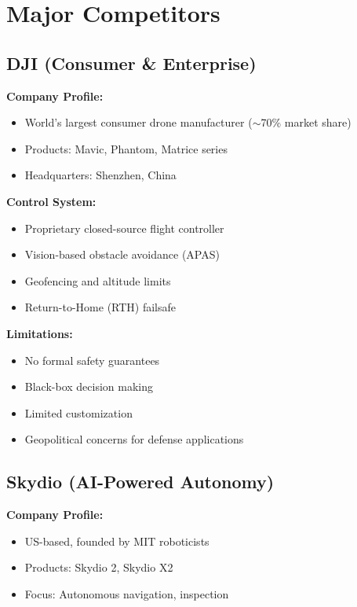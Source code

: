 \section{Major Competitors}

\subsection{DJI (Consumer \& Enterprise)}

\textbf{Company Profile:}
\begin{itemize}
    \item World's largest consumer drone manufacturer ($\sim$70\% market share)
    \item Products: Mavic, Phantom, Matrice series
    \item Headquarters: Shenzhen, China
\end{itemize}

\textbf{Control System:}
\begin{itemize}
    \item Proprietary closed-source flight controller
    \item Vision-based obstacle avoidance (APAS)
    \item Geofencing and altitude limits
    \item Return-to-Home (RTH) failsafe
\end{itemize}

\textbf{Limitations:}
\begin{itemize}
    \item No formal safety guarantees
    \item Black-box decision making
    \item Limited customization
    \item Geopolitical concerns for defense applications
\end{itemize}

\subsection{Skydio (AI-Powered Autonomy)}

\textbf{Company Profile:}
\begin{itemize}
    \item US-based, founded by MIT roboticists
    \item Products: Skydio 2, Skydio X2
    \item Focus: Autonomous navigation, inspection
\end{itemize}

